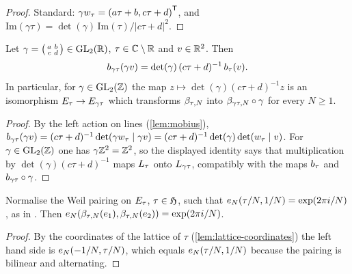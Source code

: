 \begin{proof}
Standard: $\gamma w_{\tau} = {(a\tau+b, c\tau+d)}^{\mathsf{T}}$, and
$\mathrm{Im}(\gamma\tau) = \det(\gamma)\,\mathrm{Im}(\tau)/|c\tau+d|^{2}$.
\end{proof}

\begin{lemma}
\label{lem:det-pairing-equivariance}
Let $\gamma = \smallMat{a}{b}{c}{d} \in \GL{2}{\RR}$, $\tau \in \mathbb{C}\setminus\mathbb{R}$
and $v \in \mathbb{R}^{2}$. Then
\[
  b_{\gamma\tau}(\gamma v) =
  \det(\gamma)\,(c\tau + d)^{-1}\,b_{\tau}(v).
\]
In particular, for $\gamma \in \GL{2}{\ZZ}$ the map
$z \mapsto \det(\gamma)(c\tau+d)^{-1} z$ is an isomorphism
$E_{\tau} \to E_{\gamma\tau}$ which transforms
$\beta_{\tau,N}$ into $\beta_{\gamma\tau,N} \circ \gamma$ for every
$N \geq 1$.
\end{lemma}

\begin{proof}
By the left action on lines (\cref{lem:mobius}),
$b_{\gamma\tau}(\gamma v)
= (c\tau+d)^{-1}\det(\gamma w_{\tau}\mid \gamma v)
= (c\tau+d)^{-1}\det(\gamma)\det(w_{\tau}\mid v)$.
For $\gamma \in \GL{2}{\ZZ}$ one has $\gamma\mathbb{Z}^{2} = \mathbb{Z}^{2}$,
so the displayed identity says that multiplication by
$\det(\gamma)(c\tau+d)^{-1}$ maps $L_{\tau}$ onto
$L_{\gamma\tau}$, compatibly with the maps $b_{\tau}$ and
$b_{\gamma\tau} \circ \gamma$.
\end{proof}

\begin{lemma}
\label{lem:weil-determinant}
Normalise the Weil pairing on $E_{\tau}$, $\tau \in \mathfrak{H}$,
such that $e_{N}(\tau/N, 1/N) = \exp(2\pi i/N)$, as in
\cite{DiamondShurman2005}. Then
$e_{N}(\beta_{\tau,N}(e_{1}), \beta_{\tau,N}(e_{2}))
= \exp(2\pi i/N)$.
\end{lemma}

\begin{proof}
By the coordinates of the lattice of $\tau$ (\cref{lem:lattice-coordinates})
the left hand side is $e_{N}(-1/N, \tau/N)$, which equals
$e_{N}(\tau/N, 1/N)$ because the pairing is bilinear and
alternating.
\end{proof}

